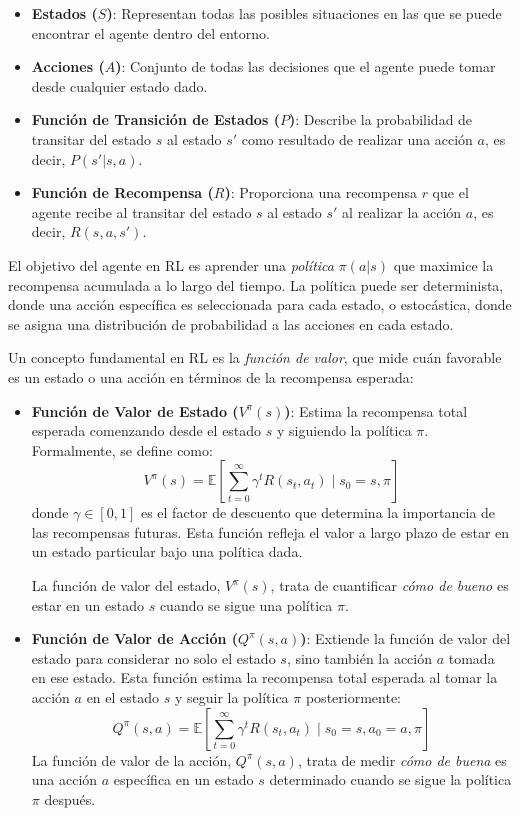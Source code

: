 \documentclass[a4paper,12pt]{report}
\begin{document}
\begin{itemize}
    \item \textbf{Estados (\(S\))}: Representan todas las posibles situaciones en las que se puede 
    encontrar el agente dentro del entorno.
    \item \textbf{Acciones (\(A\))}: Conjunto de todas las decisiones que el agente puede tomar 
    desde cualquier estado dado.
    \item \textbf{Función de Transición de Estados (\(P\))}: Describe la probabilidad de transitar 
    del estado \(s\) al estado \(s'\) como resultado de realizar una acción \(a\), es decir, \(P(s'|s, a)\).
    \item \textbf{Función de Recompensa (\(R\))}: Proporciona una recompensa \(r\) que el agente 
    recibe al transitar del estado \(s\) al estado \(s'\) al realizar la acción \(a\), es decir, \(R(s, a, s')\).
\end{itemize}

El objetivo del agente en RL es aprender una \textit{política} \(\pi(a|s)\) que maximice la recompensa 
acumulada a lo largo del tiempo. La política puede ser determinista, donde una acción específica es 
seleccionada para cada estado, o estocástica, donde se asigna una distribución de probabilidad a las
acciones en cada estado.

Un concepto fundamental en RL es la \textit{función de valor}, que mide cuán favorable es un estado 
o una acción en términos de la recompensa esperada:

\begin{itemize}
    \item \textbf{Función de Valor de Estado (\(V^{\pi}(s)\))}: Estima la recompensa total esperada 
    comenzando desde el estado \(s\) y siguiendo la política \(\pi\). Formalmente, se define como:
    \[
    V^{\pi}(s) = \mathbb{E}\left[\sum_{t=0}^{\infty} \gamma^t R(s_t, a_t) \mid s_0 = s, \pi\right]
    \]
    donde \(\gamma \in [0, 1]\) es el factor de descuento que determina la importancia de las 
    recompensas futuras. Esta función refleja el valor a largo plazo de estar en un estado particular 
    bajo una política dada.

    La función de valor del estado, \(V^{\pi}(s)\), trata de cuantificar \textit{cómo de bueno} es 
    estar en un estado \(s\) cuando se sigue una política \(\pi\).

    \item \textbf{Función de Valor de Acción (\(Q^{\pi}(s, a)\))}: Extiende la función de valor del 
    estado para considerar no solo el estado \(s\), sino también la acción \(a\) tomada en ese estado. 
    Esta función estima la recompensa total esperada al tomar la acción \(a\) en el estado \(s\) y 
    seguir la política \(\pi\) posteriormente:
    \[
    Q^{\pi}(s, a) = \mathbb{E}\left[\sum_{t=0}^{\infty} \gamma^t R(s_t, a_t) \mid s_0 = s, a_0 = a, \pi\right]
    \]
    La función de valor de la acción, \(Q^{\pi}(s, a)\), trata de medir \textit{cómo de buena} es una 
    acción \(a\) específica en un estado \(s\) determinado cuando se sigue la política \(\pi\) después.
 
\end{itemize}
\end{document}
